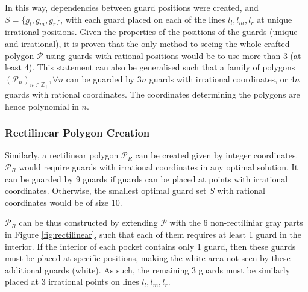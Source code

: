 In this way, dependencies between guard positions were created, and $S = \{g_l, g_m, g_r\}$, with each guard placed on each of the lines $l_l, l_m, l_r$ at unique irrational positions. Given the properties of the positions of the guards (unique and irrational), it is proven that the only method to seeing the whole crafted polygon $\mathcal P$ using guards with rational positions would be to use more than 3 (at least 4). This statement can also be generalised such that a family of polygons $(\mathcal{P}_n)_{n \in \mathbb{Z}_+}, \forall n$ can be guarded by $3n$ guards with irrational coordinates, or $4n$ guards with rational coordinates. The coordinates determining the polygons are hence polynomial in $n$.

\subsubsection{Rectilinear Polygon Creation}
Similarly, a rectilinear polygon $\mathcal P_R$ can be created given by integer coordinates. $\mathcal P_R$ would require guards with irrational coordinates in any optimal solution. It can be guarded by 9 guards if guards can be placed at points with irrational coordinates. Otherwise, the smallest optimal guard set $S$ with rational coordinates would be of size 10.

$\mathcal P_R$ can be thus constructed by extending $\mathcal P$ with the 6 non-rectiliniar gray parts in Figure \ref{fig:rectilinear}, such that each of them requires at least 1 guard in the interior. If the interior of each pocket contains only 1 guard, then these guards must be placed at specific positions, making the white area not seen by these additional guards (white). As such, the remaining 3 guards must be similarly placed at 3 irrational points on lines $l_l, l_m, l_r$.

